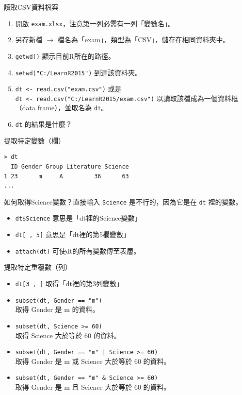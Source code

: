 \documentclass[12pt, aspectratio=43]{beamer}
\begin{document}
\begin{frame}[fragile]{讀取CSV資料檔案}
\begin{enumerate}
\item 開啟 \verb+exam.xlsx+，注意第一列必需有一列「變數名」。
\item 另存新檔 $\rightarrow$ 檔名為「exam」，類型為「CSV」，儲存在相同資料夾中。
\item \verb+getwd()+ 顯示目前R所在的路徑。
\item \verb+setwd("C:/LearnR2015")+ 到達該資料夾。
\item \verb+dt <- read.csv("exam.csv")+ 或是 \\
      \verb+dt <- read.csv("C:/LearnR2015/exam.csv")+ 以讀取該檔成為一個資料框（data frame），並取名為 \verb+dt+。\\
\item \verb+dt+ 的結果是什麼？
\end{enumerate}
\end{frame}


\begin{frame}[fragile]{提取特定變數（欄）}
\begin{verbatim}
> dt
  ID Gender Group Literature Science
1 23      m     A         36      63
...
\end{verbatim}

如何取得Science變數？直接輸入 \verb+Science+ 是不行的，因為它是在 \verb+dt+ 裡的變數。
\begin{itemize}
\item \verb+dt$Science+ 意思是「dt裡的Science變數」
\item \verb+dt[ , 5]+ 意思是「dt裡的第5欄變數」
\item \verb+attach(dt)+ 可使dt的所有變數傳至表層。
\end{itemize}
\end{frame}


\begin{frame}[fragile]{提取特定重覆數（列）}
\begin{itemize}
\item \verb+dt[3 , ]+ 取得「dt裡的第3列變數」
\item \verb+subset(dt, Gender == "m")+ \\ 取得 Gender 是 m 的資料。
\item \verb+subset(dt, Science >= 60)+ \\ 取得 Science 大於等於 60 的資料。
\item \verb+subset(dt, Gender == "m" | Science >= 60)+ \\ 取得 Gender 是 m \alert{或} Science 大於等於 60 的資料。
\item \verb+subset(dt, Gender == "m" & Science >= 60)+ \\ 取得 Gender 是 m \alert{且} Science 大於等於 60 的資料。
\end{itemize}
\end{frame}
\end{document}

